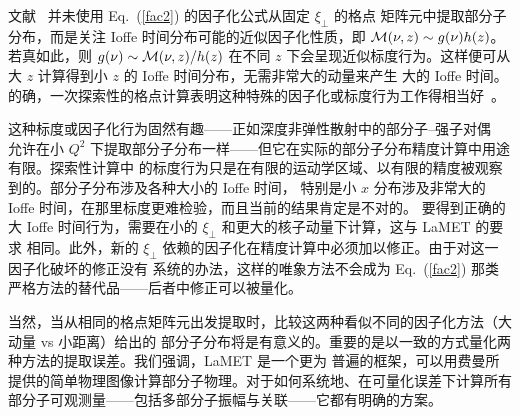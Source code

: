 文献~\cite{Radyushkin:2017cyf} 并未使用 Eq.~(\ref{fac2}) 的因子化公式从固定 $\xi_\perp$ 的格点
矩阵元中提取部分子分布，而是关注 Ioffe 时间分布可能的近似因子化性质，即
${\cal M}(\nu, z) \sim  g(\nu)h(z)$。若真如此，则 $g(\nu) \sim {\cal M}(\nu, z)/h(z)$ 在不同 $z$
下会呈现近似标度行为。这样便可从大 $z$ 计算得到小 $z$ 的 Ioffe 时间分布，无需非常大的动量来产生
大的 Ioffe 时间。的确，一次探索性的格点计算表明这种特殊的因子化或标度行为工作得相当好~\cite{Orginos:2017kos}。

这种标度或因子化行为固然有趣——正如深度非弹性散射中的部分子--强子对偶~\cite{Ji:1994br}
允许在小 $Q^2$ 下提取部分子分布一样——但它在实际的部分子分布精度计算中用途有限。探索性计算中
的标度行为只是在有限的运动学区域、以有限的精度被观察到的。部分子分布涉及各种大小的 Ioffe 时间，
特别是小 $x$ 分布涉及非常大的 Ioffe 时间，在那里标度更难检验，而且当前的结果肯定是不对的。
要得到正确的大 Ioffe 时间行为，需要在小的 $\xi_\perp$ 和更大的核子动量下计算，这与 LaMET 的要求
相同。此外，新的 $\xi_\perp$ 依赖的因子化在精度计算中必须加以修正。由于对这一因子化破坏的修正没有
系统的办法，这样的唯象方法不会成为 Eq.~(\ref{fac2}) 那类严格方法的替代品——后者中修正可以被量化。

当然，当从相同的格点矩阵元出发提取时，比较这两种看似不同的因子化方法（大动量 vs 小距离）给出的
部分子分布将是有意义的。重要的是以一致的方式量化两种方法的提取误差。我们强调，LaMET 是一个更为
普遍的框架，可以用费曼所提供的简单物理图像计算部分子物理。对于如何系统地、在可量化误差下计算所有
部分子可观测量——包括多部分子振幅与关联——它都有明确的方案。
